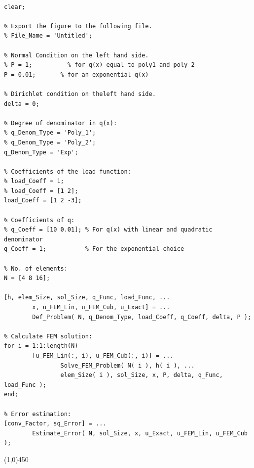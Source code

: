 \lstset{language = matlab}
\lstset{numbers = left, numberstyle = \tiny, stepnumber = 2, numbersep = 5pt}
\lstset{tabsize = 3}

\begin{lstlisting}[caption = {Main Program}, label = lst:Main_Program]

clear;

% Export the figure to the following file.
% File_Name = 'Untitled';

% Normal Condition on the left hand side.
% P = 1;          % for q(x) equal to poly1 and poly 2
P = 0.01;       % for an exponential q(x)

% Dirichlet condition on theleft hand side.
delta = 0;

% Degree of denominator in q(x):
% q_Denom_Type = 'Poly_1';
% q_Denom_Type = 'Poly_2';
q_Denom_Type = 'Exp';

% Coefficients of the load function:
% load_Coeff = 1;
% load_Coeff = [1 2];
load_Coeff = [1 2 -3];

% Coefficients of q:
% q_Coeff = [10 0.01]; % For q(x) with linear and quadratic denominator
q_Coeff = 1;           % For the exponential choice

% No. of elements:
N = [4 8 16];

[h, elem_Size, sol_Size, q_Func, load_Func, ...
		x, u_FEM_Lin, u_FEM_Cub, u_Exact] = ...
		Def_Problem( N, q_Denom_Type, load_Coeff, q_Coeff, delta, P );

% Calculate FEM solution:
for i = 1:1:length(N)
		[u_FEM_Lin(:, i), u_FEM_Cub(:, i)] = ...
				Solve_FEM_Problem( N( i ), h( i ), ...
				elem_Size( i ), sol_Size, x, P, delta, q_Func, load_Func );
end;

% Error estimation:
[conv_Factor, sq_Error] = ...
		Estimate_Error( N, sol_Size, x, u_Exact, u_FEM_Lin, u_FEM_Cub );

\end{lstlisting}
\line(1,0){450}
\vspace{5 mm}

